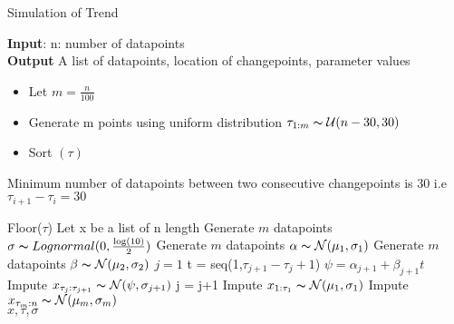 \documentclass{article}
\newcommand\tab[1][0.4cm]{\hspace*{#1}}
\begin{document}
\begin{algorithm}
\caption{Simulation of Trend}\label{alg:cap}
\textbf{Input}: n: number of datapoints\\
\textbf{Output} A list of datapoints, location of changepoints, parameter values
\begin{algorithmic}
\begin{itemize}
    \item  Let $ m = \frac{n}{100}$
    \item  Generate m points using uniform distribution $\tau_{1:m} \thicksim \mathcal{U} (n-30,30)$ 
    \item  Sort $(\tau)$
\end{itemize}
     \Ensure Minimum number of datapoints between two consecutive changepoints \tab \tab \tab is 30 i.e $\tau_{i+1} - \tau_{i} = 30$ 

\State Floor($\tau$)
\State Let x be a list of n length
\State Generate $m$ datapoints $\sigma \thicksim Lognormal(0,\frac{\log(10)}{2})$
\State Generate $m$ datapoints $\alpha \thicksim \mathcal{N}(\mu_{1},\sigma_{1})$
\State Generate $m$ datapoints $\beta \thicksim \mathcal{N}(\mu_{2},\sigma_{2})$
\State $j = 1$
    \State t = seq(1,$\tau_{j+1} - \tau_{j} + 1$)
    \State $\psi  = \alpha_{j+1} + \beta_{j+1}t$
    \State Impute  $x_{\tau_{j} : \tau_{j+1}} \thicksim \mathcal{N}(\psi,\sigma_{j+1})$
    \State j = j+1
\EndWhile
\State Impute $x_{1:\tau_{1}} \thicksim \mathcal{N}(\mu_{1},\sigma_{1})$
\State Impute $x_{\tau_{m}:n} \thicksim \mathcal{N}(\mu_{m},\sigma_{m})$ \\
\Return $x,\tau,\sigma$
\end{algorithmic}
\end{algorithm}

\end{document}
